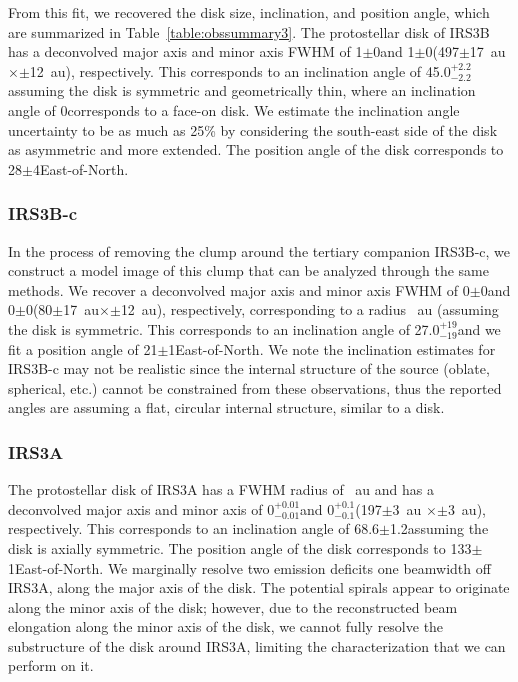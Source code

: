 From this fit, we recovered the disk size, inclination, and position angle, which are summarized in Table~\ref{table:obssummary3}. The protostellar disk of IRS3B has a deconvolved major axis and minor axis FWHM of 1$\pm$0\space and 1$\pm$0\space (497$\pm$17~au\space $\times$$\pm$12~au), respectively. This corresponds to an inclination angle of 45.0\deg$^{+2.2}_{-2.2}$\space assuming the disk is symmetric and geometrically thin, where an inclination angle of 0\deg\space corresponds to a face-on disk. We estimate the inclination angle uncertainty to be as much as 25\% \space by considering the south-east side of the disk as asymmetric and more extended. The position angle of the disk corresponds to 28$\pm$4\deg\space East-of-North. 

\subsubsection{IRS3B-c}
In the process of removing the clump around the tertiary companion IRS3B-c, we construct a model image of this clump that can be analyzed through the same methods. We recover a deconvolved major axis and minor axis FWHM of 0$\pm$0\space and 0$\pm$0\space (80$\pm$17~au\space $\times$$\pm$12~au), respectively, corresponding to a radius ~au (assuming the disk is symmetric. This corresponds to an inclination angle of 27.0\deg$^{+19}_{-19}$\space and we fit a position angle of 21$\pm$1\deg\space East-of-North. We note the inclination estimates for IRS3B-c may not be realistic since the internal structure of the source (oblate, spherical, etc.) cannot be constrained from these observations, thus the reported angles are assuming a flat, circular internal structure, similar to a disk.

\subsubsection{IRS3A}
The protostellar disk of IRS3A has a FWHM radius of ~au and has a deconvolved major axis and minor axis of 0$^{+0.01}_{-0.01}$\space and 0$^{+0.1}_{-0.1}$\space(197$\pm$3~au $\times$$\pm$3~au), respectively. This corresponds to an inclination angle of 68.6$\pm$1.2\deg\space assuming the disk is axially symmetric. The position angle of the disk corresponds to 133$\pm$1\deg\space East-of-North. We marginally resolve two emission deficits one beamwidth off IRS3A, along the major axis of the disk. The potential spirals appear to originate along the minor axis of the disk; however, due to the reconstructed beam elongation along the minor axis of the disk, we cannot fully resolve the substructure of the disk around IRS3A, limiting the characterization that we can perform on it.

